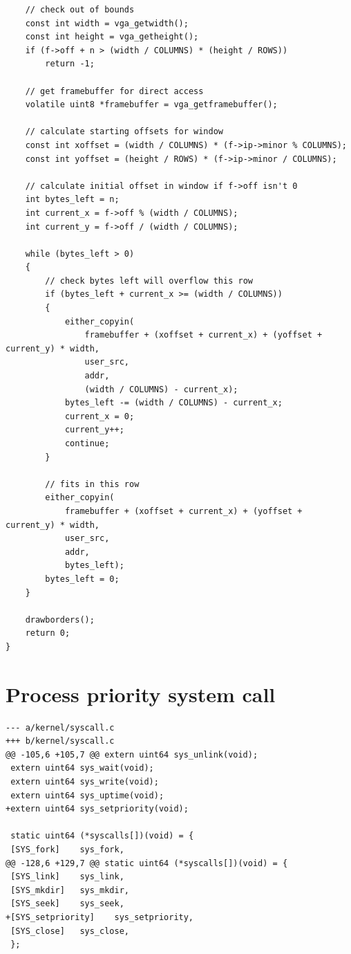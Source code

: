 \begin{appendices}
\begin{verbatim}
    // check out of bounds
    const int width = vga_getwidth();
    const int height = vga_getheight();
    if (f->off + n > (width / COLUMNS) * (height / ROWS))
        return -1;

    // get framebuffer for direct access
    volatile uint8 *framebuffer = vga_getframebuffer();

    // calculate starting offsets for window
    const int xoffset = (width / COLUMNS) * (f->ip->minor % COLUMNS);
    const int yoffset = (height / ROWS) * (f->ip->minor / COLUMNS);

    // calculate initial offset in window if f->off isn't 0
    int bytes_left = n;
    int current_x = f->off % (width / COLUMNS);
    int current_y = f->off / (width / COLUMNS);

    while (bytes_left > 0)
    {
        // check bytes left will overflow this row
        if (bytes_left + current_x >= (width / COLUMNS))
        {
            either_copyin(
                framebuffer + (xoffset + current_x) + (yoffset + current_y) * width,
                user_src,
                addr,
                (width / COLUMNS) - current_x);
            bytes_left -= (width / COLUMNS) - current_x;
            current_x = 0;
            current_y++;
            continue;
        }

        // fits in this row
        either_copyin(
            framebuffer + (xoffset + current_x) + (yoffset + current_y) * width,
            user_src,
            addr,
            bytes_left);
        bytes_left = 0;
    }

    drawborders();
    return 0;
}
\end{verbatim}

\section{Process priority system call}
\label{appendix:c:8}
\begin{verbatim}
--- a/kernel/syscall.c
+++ b/kernel/syscall.c
@@ -105,6 +105,7 @@ extern uint64 sys_unlink(void);
 extern uint64 sys_wait(void);
 extern uint64 sys_write(void);
 extern uint64 sys_uptime(void);
+extern uint64 sys_setpriority(void);
 
 static uint64 (*syscalls[])(void) = {
 [SYS_fork]    sys_fork,
@@ -128,6 +129,7 @@ static uint64 (*syscalls[])(void) = {
 [SYS_link]    sys_link,
 [SYS_mkdir]   sys_mkdir,
 [SYS_seek]    sys_seek,
+[SYS_setpriority]    sys_setpriority,
 [SYS_close]   sys_close,
 };
 

\end{verbatim}
\end{appendices}
